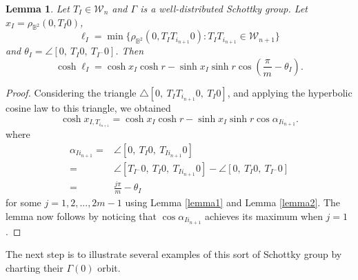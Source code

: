 \documentclass[12pt,oneside]{sfsuthesis}
\theoremstyle{plain} %
\newtheorem{lemma}[theorem]{Lemma}
\theoremstyle{definition}  %
\newtheorem{definition}{Definition}[chapter]
\theoremstyle{remark}  %
\theoremstyle{plain}
\begin{document}
{\begin{lemma}\label{upper bound lemma}
Let $T_I\in{\mathcal W}_n$ and $\Gamma$ is a well-distributed Schottky group. Let $x_I = \rho_{\mathbb{B}^2}(0, T_I0)$, 
$$
\ell_I = \min \{ \rho_{\mathbb{B}^2}(0, T_{I}T_{i_{n+1}}0):  T_IT_{i_{n+1}}\in {\mathcal W}_{n+1}\}
$$ 
and $\theta_I = \angle [0,  \ T_I0,  \ T_{I^{-}}0]$.
Then
$$
\cosh \ell_I = \cosh x_I \cosh r-\sinh x_I  \sinh r \cos \left(\frac{\pi}{m}-\theta_I\right).
$$
\end{lemma}
\begin{proof}
Considering the triangle $\bigtriangleup [0, \ T_{I}T_{i_{n+1}}0, \ T_I0]$, and applying the hyperbolic cosine law to this triangle, we obtained
$$
\cosh x_{I,T_{i_{n+1}}} = \cosh x_I \cosh r-\sinh x_I  \sinh r \cos \alpha_{Ii_{n+1}}.
$$
where 
$$
\begin{aligned}
\alpha_{Ii_{n+1}} =  & \angle [0, \ T_{I}0, \ T_{Ii_{n+1}}0] \\
 = & \angle [T_{I^-}0 , \ T_{I}0, \ T_{Ii_{n+1}}0] - \angle [0,  \ T_I0,  \ T_{I^{-}}0] \\
 = & \frac{j\pi}{m}-\theta_I
\end{aligned}
$$ 
for some $j=1,2,...,2m-1$ using Lemma \ref{lemma1} and Lemma \ref{lemma2}. The lemma now follows by noticing that $\cos\alpha_{Ii_{n+1}}$ achieves its maximum when $j=1$. 
\end{proof}







The next step is to illustrate several examples of this sort of Schottky group by charting their $\Gamma(0)$ orbit.

}
\end{document}
